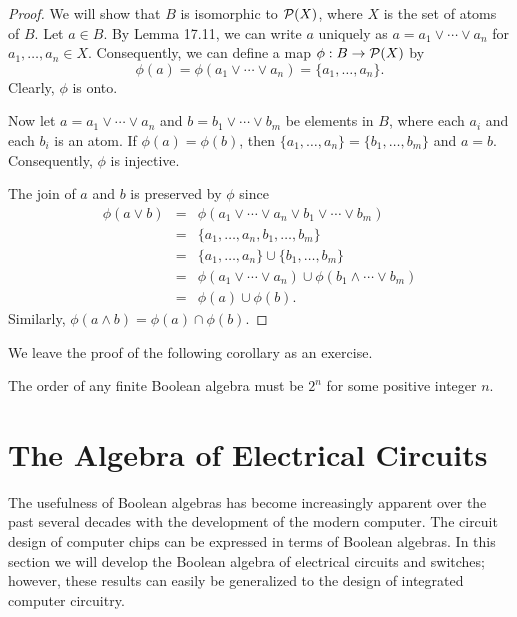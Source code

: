  
\begin{proof} 
We will show that $B$ is isomorphic to ${\cal P}(X)$, where $X$ is the
set of atoms of $B$. Let $a \in B$. By Lemma 17.11, we can write $a$
uniquely as $a = a_1 \vee \cdots \vee a_n$ for $a_1, \ldots, a_n \in
X$. Consequently, we can define a  map $\phi : B \rightarrow {\cal
P}(X)$ by  
$$
\phi(a) = \phi(  a_1 \vee \cdots \vee a_n ) = \{a_1, \ldots, a_n \}.
$$
Clearly, $\phi$ is onto.
 
 
Now let $a = a_1 \vee \cdots \vee a_n$ and $b = b_1 \vee \cdots
\vee b_m$ be elements in $B$, where each $a_i$ and each $b_i$ is an
atom. If $\phi(a) = \phi(b)$, then $\{a_1, \ldots, a_n \} = \{b_1,
\ldots, b_m \}$ and $a = b$. Consequently, $\phi$ is injective.
 
 
The join of $a$ and $b$ is preserved by $\phi$ since
\begin{eqnarray*}
\phi(a \vee b) & = & \phi( a_1 \vee \cdots \vee a_n \vee b_1 \vee
\cdots \vee b_m ) \\
& = & \{ a_1, \ldots, a_n, b_1, \ldots, b_m \} \\
& = & \{ a_1, \ldots, a_n \} \cup \{ b_1, \ldots, b_m \} \\
& = & \phi( a_1 \vee \cdots \vee a_n ) \cup \phi( b_1 \wedge \cdots
\vee b_m ) \\ 
& = & \phi(a) \cup \phi(b).
\end{eqnarray*}
Similarly, $\phi( a \wedge b ) = \phi(a) \cap \phi(b)$.
\end{proof}
 
 
\medskip
 
 
We leave the proof of the following corollary as an exercise.
 
 
\begin{corollary}
The order of any finite Boolean algebra must be $2^n$ for some
positive integer $n$.
\end{corollary}
 
 
 
\section{The Algebra of Electrical Circuits}
 
 
The usefulness of Boolean algebras has become increasingly apparent
over the past several decades with the development of the modern
computer. The circuit design of computer chips can be expressed in
terms of Boolean algebras. In this section we will develop the Boolean
algebra of electrical circuits and switches; however, these results
can easily be generalized to the design of integrated computer
circuitry.  
 
